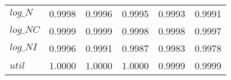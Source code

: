 \begin{center}
\begin{longtable}{lccccc}
$log\_N          $	 & 	     0.9998	 & 	     0.9996	 & 	     0.9995	 & 	     0.9993	 & 	     0.9991 \\ 
$log\_NC         $	 & 	     0.9999	 & 	     0.9999	 & 	     0.9998	 & 	     0.9998	 & 	     0.9997 \\ 
$log\_NI         $	 & 	     0.9996	 & 	     0.9991	 & 	     0.9987	 & 	     0.9983	 & 	     0.9978 \\ 
${util}          $	 & 	     1.0000	 & 	     1.0000	 & 	     1.0000	 & 	     0.9999	 & 	     0.9999 \\ 
\end{longtable}
 \end{center}
